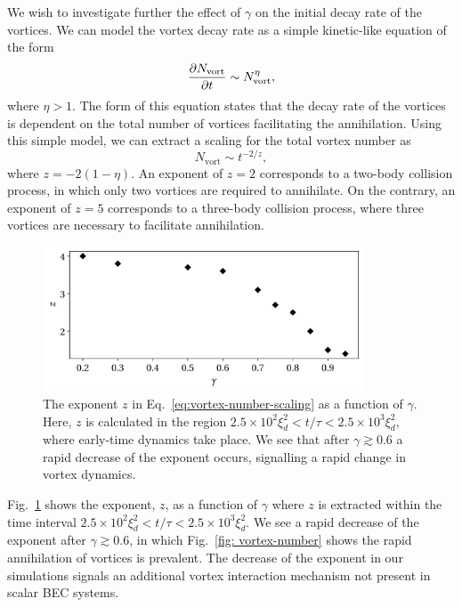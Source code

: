 We wish to investigate further the effect of \(\gamma \) on the initial decay
rate of the vortices.
We can model the vortex decay rate as a simple kinetic-like equation of the form
\begin{equation}
    \pdv{N_\mathrm{vort}}{t} \sim N_\mathrm{vort}^\eta,
\end{equation}
where \(\eta > 1\).
The form of this equation states that the decay rate of the vortices is
dependent on the total number of vortices facilitating the annihilation.
Using this simple model, we can extract a scaling for the total vortex
number as
\begin{equation}
    N_\mathrm{vort} \sim t^{-2/z},
    \label{eq:vortex-number-scaling}
\end{equation}
where \(z=-2(1-\eta)\).
An exponent of \(z=2\) corresponds to a two-body collision process, in which
only two vortices are required to annihilate.
On the contrary, an exponent of \(z=5\) corresponds to a three-body collision
process, where three vortices are necessary to facilitate annihilation.
\begin{figure}[t!]
    \centering
    \includegraphics[width=0.85\textwidth]{
        gfx/ch-twoCompDynamics/gamma_vs_expo.pdf}
    \caption[Critical exponent of the vortex decay scaling as a function of the
    ratio of inter- to intra-species interaction]
    {\label{fig: exponent-vs-gamma}The exponent \( z \) in
        Eq.~\eqref{eq:vortex-number-scaling} as a function of \(\gamma \).
        Here, \(z\) is calculated in the region \(2.5 \times 10^2\xi_d^2 <
        t/\tau < 2.5\times10^3\xi_d^2\), where early-time dynamics take place.
        We see that after \(\gamma \gtrsim 0.6\) a rapid decrease of the
        exponent occurs, signalling a rapid change in vortex dynamics.}
\end{figure}
Fig.~\ref{fig: exponent-vs-gamma} shows the exponent, \( z \), as a function of
\(\gamma \) where \( z \) is extracted within the time interval
\(2.5 \times 10^2\xi_d^2 < t/\tau < 2.5\times10^3\xi_d^2\).
We see a rapid decrease of the exponent after \(\gamma \gtrsim 0.6\), in which
Fig.~\ref{fig: vortex-number} shows the rapid annihilation of vortices is
prevalent.
The decrease of the exponent in our simulations signals an additional vortex
interaction mechanism not present in scalar BEC systems.

